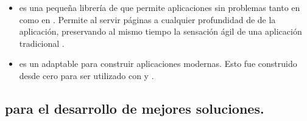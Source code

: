 \begin{itemize}
		\item
			\textbf{\rendrNAME} es una pequeña librería de \airbnbNAME \cite{online_technology_airbnb_officialsite} que permite \runCPT aplicaciones \backbonejsNAME sin problemas tanto en \clientSideAS como en \serverSideAS. Permite al \webserverINT servir páginas \htmlNAME \fullyFormedCPT a cualquier profundidad de \linkINT de la aplicación, preservando al mismo tiempo la sensación ágil de una aplicación \mvcAS \clientSideAS \backbonejsNAME tradicional \cite{online_technology_isomorphic_javascript_frameworks}.
		\item
			\textbf{\flatironNAME} es un \frameworkPC adaptable para construir aplicaciones \webINT modernas. Esto fue construido desde cero para ser utilizado con \javaScriptNAME y \nodejsNAME \cite{online_technology_flatiron_officialsite}.

	\end{itemize}

	

\subsection{\toolsCPT para el desarrollo de mejores soluciones.}

